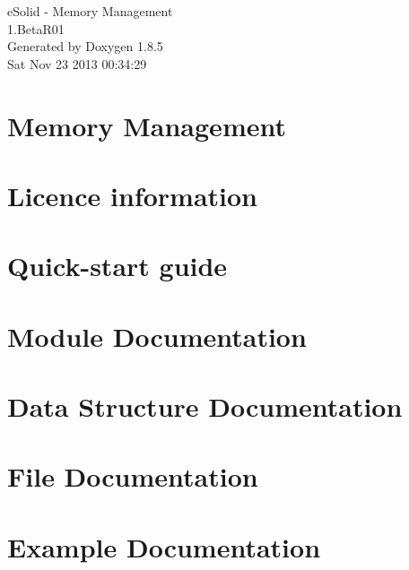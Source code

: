 \documentclass[twoside]{article}
\begin{document}
\hypersetup{pageanchor=false}
\begin{titlepage}
\vspace*{7cm}
\begin{center}%
{\Large e\-Solid -\/ Memory Management \\[1ex]\large 1.\-Beta\-R01 }\\
\vspace*{1cm}
{\large Generated by Doxygen 1.8.5}\\
\vspace*{0.5cm}
{\small Sat Nov 23 2013 00:34:29}\\
\end{center}
\end{titlepage}
\tableofcontents
{}
\hypersetup{pageanchor=true}

\section{Memory Management}
\label{index}\hypertarget{index}{}
\section{Licence information}
\label{md__home_nenad_workspace_eclipse_esolid-mem_COPYING}
\hypertarget{md__home_nenad_workspace_eclipse_esolid-mem_COPYING}{}

\section{Quick-\/start guide}
\label{md__home_nenad_workspace_eclipse_esolid-mem_README}
\hypertarget{md__home_nenad_workspace_eclipse_esolid-mem_README}{}

\section{Module Documentation}




\section{Data Structure Documentation}





\section{File Documentation}






\section{Example Documentation}








\newpage
{}
{}
\printindex
\end{document}
